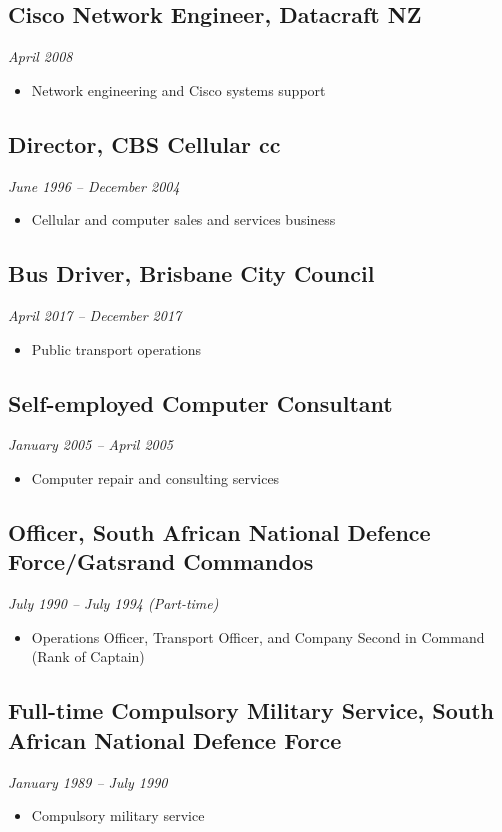 \documentclass[11pt,a4paper]{article}
\begin{document}
\subsection*{Cisco Network Engineer, Datacraft NZ}
\textit{April 2008}
\begin{itemize}
    \item Network engineering and Cisco systems support
\end{itemize}

\subsection*{Director, CBS Cellular cc}
\textit{June 1996 – December 2004}
\begin{itemize}
    \item Cellular and computer sales and services business
\end{itemize}

\subsection*{Bus Driver, Brisbane City Council}
\textit{April 2017 – December 2017}
\begin{itemize}
    \item Public transport operations
\end{itemize}

\subsection*{Self-employed Computer Consultant}
\textit{January 2005 – April 2005}
\begin{itemize}
    \item Computer repair and consulting services
\end{itemize}

\subsection*{Officer, South African National Defence Force/Gatsrand Commandos}
\textit{July 1990 – July 1994 (Part-time)}
\begin{itemize}
    \item Operations Officer, Transport Officer, and Company Second in Command (Rank of Captain)
\end{itemize}

\subsection*{Full-time Compulsory Military Service, South African National Defence Force}
\textit{January 1989 – July 1990}
\begin{itemize}
    \item Compulsory military service
\end{itemize}
\end{document}
